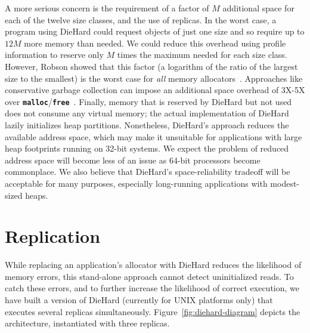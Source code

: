 \documentclass{sig-alternate}
\newcommand{\cfunction}[1]{{\bf \tt #1}}
\newcommand{\malloc}{\cfunction{malloc}}
\newcommand{\free}{\cfunction{free}}
\begin{document}
A more serious concern is the requirement of a factor of $M$
additional space for each of the twelve size classes, and the use of
replicas. In the worst case, a program using DieHard could request
objects of just one size and so require up to $12M$ more memory than
needed. We could reduce this overhead using profile information to
reserve only $M$ times the maximum needed for each size
class. However, Robson showed that this factor (a logarithm of the
ratio of the largest size to the smallest) is the worst case for
\emph{all} memory allocators~\cite{robs74}. Approaches like
conservative garbage collection can impose an additional space
overhead of 3X-5X over
\malloc{}/\free{}~\cite{hert05a,zorn93}. Finally, memory that is
reserved by DieHard but not used does not consume any virtual memory;
the actual implementation of DieHard lazily initializes heap
partitions. Nonetheless, DieHard's approach reduces the available
address space, which may make it unsuitable for applications with
large heap footprints running on 32-bit systems. We expect the problem
of reduced address space will become less of an issue as 64-bit
processors become commonplace. We also believe that DieHard's
space-reliability tradeoff will be acceptable for many purposes,
especially long-running applications with modest-sized heaps.

\section{Replication}
\label{sec:replication}


\noindent
While replacing an application's allocator with DieHard reduces the
likelihood of memory errors, this stand-alone approach cannot detect
uninitialized reads. To catch these errors, and to further increase
the likelihood of correct execution, we have built a version of
DieHard (currently for UNIX platforms only) that executes several
replicas simultaneously. Figure~\ref{fig:diehard-diagram} depicts the
architecture, instantiated with three replicas.
\end{document}
